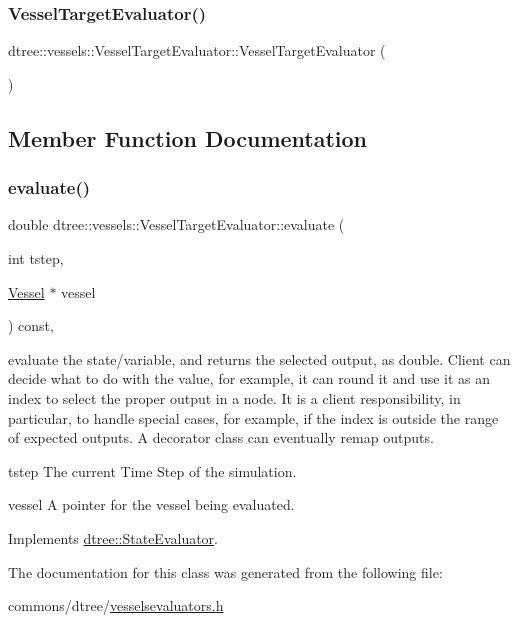 \subsubsection{\texorpdfstring{VesselTargetEvaluator()}{VesselTargetEvaluator()}}
{\footnotesize\ttfamily dtree\+::vessels\+::\+Vessel\+Target\+Evaluator\+::\+Vessel\+Target\+Evaluator (\begin{DoxyParamCaption}{ }\end{DoxyParamCaption})\hspace{0.3cm}{\ttfamily [inline]}}



\subsection{Member Function Documentation}
\mbox{\label{classdtree_1_1vessels_1_1_vessel_target_evaluator_aec3df95c80f6272021c84c92b900741a}} 
\subsubsection{\texorpdfstring{evaluate()}{evaluate()}}
{\footnotesize\ttfamily double dtree\+::vessels\+::\+Vessel\+Target\+Evaluator\+::evaluate (\begin{DoxyParamCaption}\item[{int}]{tstep,  }\item[{\mbox{\hyperlink{class_vessel}{Vessel}} $\ast$}]{vessel }\end{DoxyParamCaption}) const\hspace{0.3cm}{\ttfamily [inline]}, {\ttfamily [virtual]}}



evaluate the state/variable, and returns the selected output, as double. Client can decide what to do with the value, for example, it can round it and use it as an index to select the proper output in a node. It is a client responsibility, in particular, to handle special cases, for example, if the index is outside the range of expected outputs. A decorator class can eventually remap outputs. 

\begin{DoxyItemize}
\item tstep The current Time Step of the simulation. \item vessel A pointer for the vessel being evaluated. \end{DoxyItemize}


Implements \mbox{\hyperlink{classdtree_1_1_state_evaluator_ab57666219fbdc728f40d9d5acd5726cb}{dtree\+::\+State\+Evaluator}}.



The documentation for this class was generated from the following file\+:\begin{DoxyCompactItemize}
\item 
commons/dtree/\mbox{\hyperlink{vesselsevaluators_8h}{vesselsevaluators.\+h}}\end{DoxyCompactItemize}
